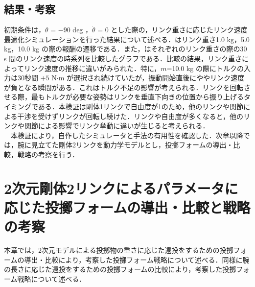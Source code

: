 \begin{small}
\subsection{結果・考察}
初期条件は，$\theta$ = $-90$ deg ，$\dot{\theta}$ = 0 とした際の，リンク重さに応じたリンク速度最適化シミュレーションを行った結果について述べる．はリンク重さ1.0 kg，5.0 kg，10.0 kg の際の報酬の遷移である．また，はそれぞれのリンク重さの際の30 s 間のリンク速度の時系列を比較したグラフである．比較の結果，リンク重さによってリンク速度の推移に違いがみられた．特に，$m$=10.0 kg の際にトルクの入力は30秒間 $+ 5$ N$\cdot$m が選択され続けていたが，振動開始直後にややリンク速度が負となる瞬間がある．これはトルク不足の影響が考えられる．リンクを回転させる際，最もトルクが必要な姿勢はリンクを垂直下向きの位置から振り上げるタイミングである．本検証は剛体1リンクで自由度が1のため，他のリンクや関節による干渉を受けずリンクが回転し続けた．リンクや自由度が多くなると，他のリンクや関節による影響でリンク挙動に違いが生じると考えられる．\\
　本検証により，自作したシミュレータと手法の有用性を確認した．次章以降では，腕に見立てた剛体2リンクを動力学モデルとし，投擲フォームの導出・比較，戦略の考察を行う．

\section{2次元剛体2リンクによるパラメータに応じた投擲フォームの導出・比較と戦略の考察}
本章では，2次元モデルによる投擲物の重さに応じた遠投をするための投擲フォームの導出・比較により，考察した投擲フォーム戦略について述べる．同様に腕の長さに応じた遠投をするための投擲フォームの比較により，考察した投擲フォーム戦略について述べる．

\end{small}
